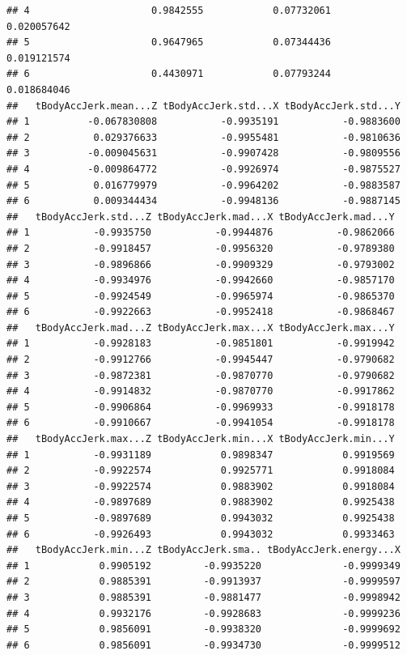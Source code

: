 \documentclass[
]{article}
\begin{document}
\begin{verbatim}
## 4                     0.9842555            0.07732061           0.020057642
## 5                     0.9647965            0.07344436           0.019121574
## 6                     0.4430971            0.07793244           0.018684046
##   tBodyAccJerk.mean...Z tBodyAccJerk.std...X tBodyAccJerk.std...Y
## 1          -0.067830808           -0.9935191           -0.9883600
## 2           0.029376633           -0.9955481           -0.9810636
## 3          -0.009045631           -0.9907428           -0.9809556
## 4          -0.009864772           -0.9926974           -0.9875527
## 5           0.016779979           -0.9964202           -0.9883587
## 6           0.009344434           -0.9948136           -0.9887145
##   tBodyAccJerk.std...Z tBodyAccJerk.mad...X tBodyAccJerk.mad...Y
## 1           -0.9935750           -0.9944876           -0.9862066
## 2           -0.9918457           -0.9956320           -0.9789380
## 3           -0.9896866           -0.9909329           -0.9793002
## 4           -0.9934976           -0.9942660           -0.9857170
## 5           -0.9924549           -0.9965974           -0.9865370
## 6           -0.9922663           -0.9952418           -0.9868467
##   tBodyAccJerk.mad...Z tBodyAccJerk.max...X tBodyAccJerk.max...Y
## 1           -0.9928183           -0.9851801           -0.9919942
## 2           -0.9912766           -0.9945447           -0.9790682
## 3           -0.9872381           -0.9870770           -0.9790682
## 4           -0.9914832           -0.9870770           -0.9917862
## 5           -0.9906864           -0.9969933           -0.9918178
## 6           -0.9910667           -0.9941054           -0.9918178
##   tBodyAccJerk.max...Z tBodyAccJerk.min...X tBodyAccJerk.min...Y
## 1           -0.9931189            0.9898347            0.9919569
## 2           -0.9922574            0.9925771            0.9918084
## 3           -0.9922574            0.9883902            0.9918084
## 4           -0.9897689            0.9883902            0.9925438
## 5           -0.9897689            0.9943032            0.9925438
## 6           -0.9926493            0.9943032            0.9933463
##   tBodyAccJerk.min...Z tBodyAccJerk.sma.. tBodyAccJerk.energy...X
## 1            0.9905192         -0.9935220              -0.9999349
## 2            0.9885391         -0.9913937              -0.9999597
## 3            0.9885391         -0.9881477              -0.9998942
## 4            0.9932176         -0.9928683              -0.9999236
## 5            0.9856091         -0.9938320              -0.9999692
## 6            0.9856091         -0.9934730              -0.9999512

\end{verbatim}
\end{document}
